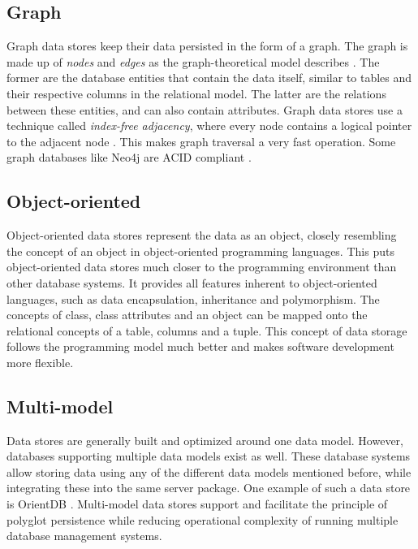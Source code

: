 \subsection{Graph}
\label{subsec:graph}

Graph data stores keep their data persisted in the form of a graph.
The graph is made up of \textit{nodes} and \textit{edges} as the graph-theoretical model describes \autocite{West2001}.
The former are the database entities that contain the data itself, similar to tables and their respective columns in the relational model.
The latter are the relations between these entities, and can also contain attributes.
Graph data stores use a technique called \textit{index-free adjacency}, where every node contains a logical pointer to the adjacent node \autocite{Weinberger2016}.
This makes graph traversal a very fast operation.
Some graph databases like Neo4j are ACID compliant \autocite{miller2013}.

\subsection{Object-oriented}
\label{subsec:object-oriented}

Object-oriented data stores represent the data as an object, closely resembling the concept of an object in object-oriented programming languages.
This puts object-oriented data stores much closer to the programming environment than other database systems.
It provides all features inherent to object-oriented languages, such as data encapsulation, inheritance and polymorphism.
The concepts of class, class attributes and an object can be mapped onto the relational concepts of a table, columns and a tuple.
This concept of data storage follows the programming model much better and makes software development more flexible.

\subsection{Multi-model}
\label{subsec:multi-model}

Data stores are generally built and optimized around one data model.
However, databases supporting multiple data models exist as well.
These database systems allow storing data using any of the different data models mentioned before, while integrating these into the same server package.
One example of such a data store is OrientDB \autocite{OrientDB2010}.
Multi-model data stores support and facilitate the principle of polyglot persistence while reducing operational complexity of running multiple database management systems.

